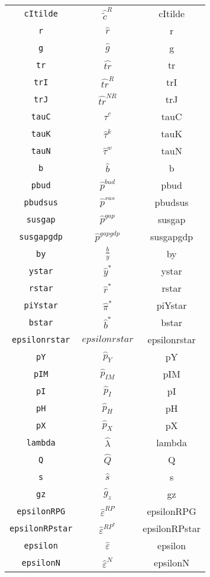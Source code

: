 \begin{center}
\begin{longtable}{ccc}
\texttt{cItilde} & $\hat{\tilde{c}}^R$ & cItilde\\
\texttt{r} & $\hat{r}$ & r\\
\texttt{g} & $\hat{g}$ & g\\
\texttt{tr} & $\hat{tr}$ & tr\\
\texttt{trI} & $\hat{tr}^R$ & trI\\
\texttt{trJ} & $\hat{tr}^{NR}$ & trJ\\
\texttt{tauC} & $\hat{\tau}^c$ & tauC\\
\texttt{tauK} & $\hat{\tau}^k$ & tauK\\
\texttt{tauN} & $\hat{\tau}^w$ & tauN\\
\texttt{b} & $\hat{b}$ & b\\
\texttt{pbud} & $\hat{p}^{bud}$ & pbud\\
\texttt{pbudsus} & $\hat{p}^{sus}$ & pbudsus\\
\texttt{susgap} & $\hat{p}^{gap}$ & susgap\\
\texttt{susgapgdp} & $\hat{p}^{gapgdp}$ & susgapgdp\\
\texttt{by} & $\frac{b}{y}$ & by\\
\texttt{ystar} & $\hat{y}^*$ & ystar\\
\texttt{rstar} & $\hat{r}^*$ & rstar\\
\texttt{piYstar} & $\hat{\pi}^*$ & piYstar\\
\texttt{bstar} & $\hat{b}^*$ & bstar\\
\texttt{epsilonrstar} & $epsilonrstar$ & epsilonrstar\\
\texttt{pY} & $\hat{p}_Y$ & pY\\
\texttt{pIM} & $\hat{p}_{IM}$ & pIM\\
\texttt{pI} & $\hat{p}_I$ & pI\\
\texttt{pH} & $\hat{p}_H$ & pH\\
\texttt{pX} & $\hat{p}_X$ & pX\\
\texttt{lambda} & $\hat{\lambda}$ & lambda\\
\texttt{Q} & $\hat{Q}$ & Q\\
\texttt{s} & $\hat{s}$ & s\\
\texttt{gz} & $\hat{g}_z$ & gz\\
\texttt{epsilonRPG} & $\hat{\varepsilon}^{RP}$ & epsilonRPG\\
\texttt{epsilonRPstar} & $\hat{\varepsilon}^{RP^*}$ & epsilonRPstar\\
\texttt{epsilon} & $\hat{\varepsilon}$ & epsilon\\
\texttt{epsilonN} & $\hat{\varepsilon}^N$ & epsilonN\\

\end{longtable}
\end{center}
